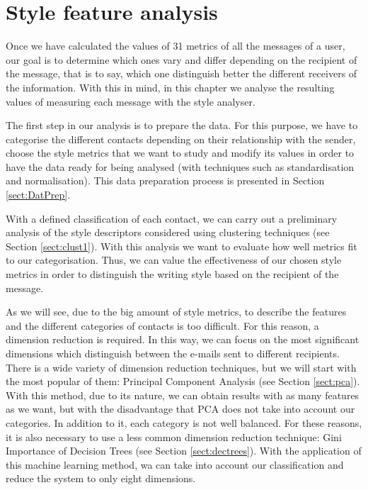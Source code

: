 \chapter{Style feature analysis}\label{cap:analysis}


Once we have calculated the values of 31 metrics of all the messages of a user, our goal is to determine which ones vary and differ depending on the recipient of the message, that is to say, which one distinguish better the different receivers of the information. With this in mind, in this chapter we analyse the resulting values of measuring each message with the style analyser.

The first step in our analysis is to prepare the data. For this purpose, we have to categorise the different contacts depending on their relationship with the sender, choose the style metrics that we want to study and modify its values in order to have the data ready for being analysed (with techniques such as standardisation and normalisation). This data preparation process is presented in Section \ref{sect:DatPrep}.

With a defined classification of each contact, we can carry out a preliminary analysis of the style descriptors considered using clustering techniques (see Section \ref{sect:clust1}). With this analysis we want to evaluate how well metrics fit to our categorisation. Thus, we can value the effectiveness of our chosen style metrics in order to distinguish the writing style based on the recipient of the message.

As we will see, due to the big amount of style metrics, to describe the features and the different categories of contacts is too difficult. For this reason, a dimension reduction is required. In this way, we can focus on the most significant dimensions which distinguish between the e-mails sent to different recipients. There is a wide variety of dimension reduction techniques, but we will start with the most popular of them: Principal Component Analysis (see Section \ref{sect:pca}). With this method, due to its nature, we can obtain results with as many features as we want, but with the disadvantage that PCA does not take into account our categories. In addition to it, each category is not well balanced. For these reasons, it is also necessary to use a less common dimension reduction technique: Gini Importance of Decision Trees (see Section \ref{sect:dectrees}). With the application of this machine learning method, wa can take into account our classification and reduce the system to only eight dimensions.

